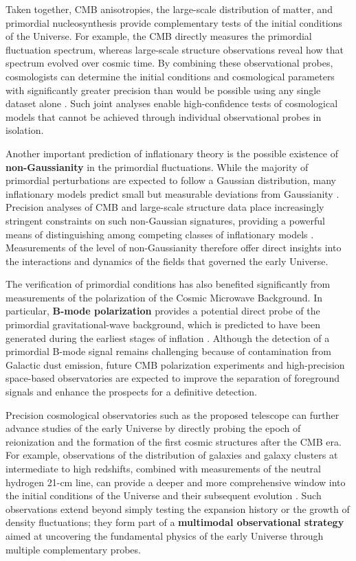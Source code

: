 Taken together, CMB anisotropies, the large-scale distribution of matter, and primordial nucleosynthesis provide complementary tests of the initial conditions of the Universe. For example, the CMB directly measures the primordial fluctuation spectrum, whereas large-scale structure observations reveal how that spectrum evolved over cosmic time. By combining these observational probes, cosmologists can determine the initial conditions and cosmological parameters with significantly greater precision than would be possible using any single dataset alone \cite{tegmark2004,komatsu2011}. Such joint analyses enable high-confidence tests of cosmological models that cannot be achieved through individual observational probes in isolation.

Another important prediction of inflationary theory is the possible existence of \textbf{non-Gaussianity} in the primordial fluctuations. While the majority of primordial perturbations are expected to follow a Gaussian distribution, many inflationary models predict small but measurable deviations from Gaussianity \cite{bartolo2004}. Precision analyses of CMB and large-scale structure data place increasingly stringent constraints on such non-Gaussian signatures, providing a powerful means of distinguishing among competing classes of inflationary models \cite{planck2020,akrami2020,meerburg2019}. Measurements of the level of non-Gaussianity therefore offer direct insights into the interactions and dynamics of the fields that governed the early Universe.

The verification of primordial conditions has also benefited significantly from measurements of the polarization of the Cosmic Microwave Background. In particular, \textbf{B-mode polarization} provides a potential direct probe of the primordial gravitational-wave background, which is predicted to have been generated during the earliest stages of inflation \cite{kamionkowski2016}. Although the detection of a primordial B-mode signal remains challenging because of contamination from Galactic dust emission, future CMB polarization experiments and high-precision space-based observatories are expected to improve the separation of foreground signals and enhance the prospects for a definitive detection.

Precision cosmological observatories such as the proposed telescope can further advance studies of the early Universe by directly probing the epoch of reionization and the formation of the first cosmic structures after the CMB era. For example, observations of the distribution of galaxies and galaxy clusters at intermediate to high redshifts, combined with measurements of the neutral hydrogen 21-cm line, can provide a deeper and more comprehensive window into the initial conditions of the Universe and their subsequent evolution \cite{furlanetto2006,pritchard2012}. Such observations extend beyond simply testing the expansion history or the growth of density fluctuations; they form part of a \textbf{multimodal observational strategy} aimed at uncovering the fundamental physics of the early Universe through multiple complementary probes.

